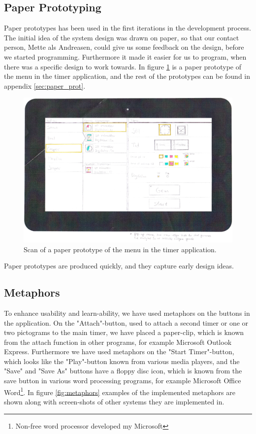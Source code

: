 \subsection*{Paper Prototyping}
Paper prototypes\cite{misc:designInterSys} has been used in the first iterations in the development process. The initial idea of the system design was drawn on paper, so that our contact person, Mette als Andreasen, could give us some feedback on the design, before we started programming. Furthermore it made it easier for us to program, when there was a specific design to work towards. In figure \ref{fig:pap_prot_menu} is a paper prototype of the menu in the timer application, and the rest of the prototypes can be found in appendix \ref{sec:paper_prot}.

\begin{figure}[H]
	\centering
		\includegraphics[width=\textwidth]{Images/paper_prototype/menu.png}
			\caption{Scan of a paper prototype of the menu in the timer application.}
	\label{fig:pap_prot_menu}
\end{figure}

Paper prototypes are produced quickly, and they capture early design ideas.

\subsection{Metaphors}
To enhance usability and learn-ability, we have used metaphors\cite{misc:designInterSys} on the buttons in the application. On the "Attach"-button, used to attach a second timer or one or two pictograms to the main timer, we have placed a paper-clip, which is known from the attach function in other programs, for example Microsoft Outlook Express. Furthermore we have used metaphors on the "Start Timer"-button, which looks like the "Play"-button known from various media players, and the "Save" and "Save As" buttons have a floppy disc icon, which is known from the save button in various word processing programs, for example Microsoft Office Word\footnote{Non-free word processor developed my Microsoft}. In figure \ref{fig:metaphors} examples of the implemented metaphors are shown along with screen-shots of other systems they are implemented in.

